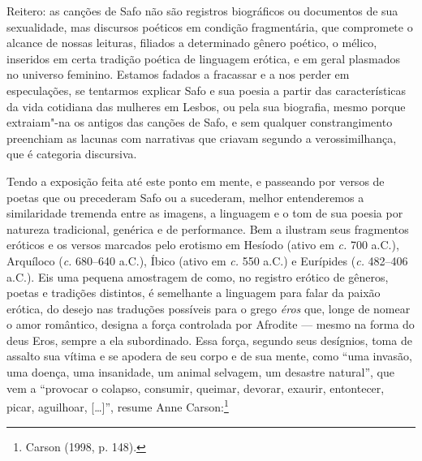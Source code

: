 Reitero: as canções de Safo não
são registros biográficos ou documentos de sua sexualidade, mas discursos
poéticos em condição fragmentária, que compromete o alcance de nossas leituras,
filiados a determinado gênero poético, o mélico, inseridos em certa tradição
poética de linguagem erótica, e em geral plasmados no universo feminino. Estamos fadados a fracassar e a nos perder em
especulações, se tentarmos explicar Safo e sua poesia a partir das
características da vida cotidiana das mulheres em Lesbos, ou pela sua
biografia, mesmo porque extraiam"-na os antigos das canções de Safo, e
sem qualquer constrangimento preenchiam as lacunas com narrativas
que criavam segundo a verossimilhança, que é categoria discursiva.

Tendo a exposição feita até este ponto em mente, e passeando por versos de poetas que ou precederam Safo ou
a sucederam, melhor entenderemos a similaridade tremenda entre as imagens, a
linguagem e o tom de sua poesia por natureza tradicional, genérica e de performance. Bem a ilustram seus fragmentos eróticos e os versos marcados pelo
erotismo em Hesíodo (ativo em \textit{c.} 700 a.C.), Arquíloco (\textit{c.} 680--640
a.C.), Íbico (ativo em \textit{c.} 550 a.C.) e Eurípides (\textit{c.} 482--406 a.C.). Eis
uma pequena amostragem de como, no registro erótico de gêneros, poetas e
tradições distintos, é semelhante a linguagem para falar da paixão erótica, do
desejo nas traduções possíveis para o grego \textit{éros} que, longe de nomear
o amor romântico, designa a força controlada por Afrodite --- mesmo na forma do
deus Eros, sempre a ela subordinado. Essa força, segundo seus desígnios, toma de
assalto sua vítima e se apodera de seu corpo e de sua mente, como “uma invasão,
uma doença, uma insanidade, um animal selvagem, um desastre natural”, que vem a
“provocar o colapso, consumir, queimar, devorar, exaurir, entontecer, picar,
aguilhoar, [\ldots{}]”, resume Anne Carson:\footnote{ Carson (1998, p. 148).}

